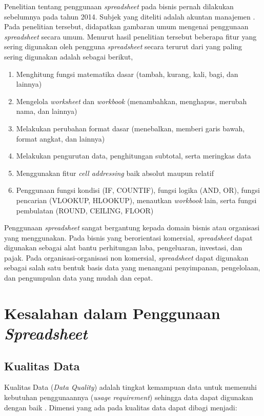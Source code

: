 Penelitian tentang penggunaan \textit{spreadsheet} pada bisnis pernah dilakukan sebelumnya pada tahun 2014. Subjek yang diteliti adalah akuntan manajemen \citep{Bradbard2014}. Pada penelitian tersebut, didapatkan gambaran umum mengenai penggunaan \textit{spreadsheet} secara umum. Menurut hasil penelitian tersebut beberapa fitur yang sering digunakan oleh pengguna \textit{spreadsheet} secara terurut dari yang paling sering digunakan adalah sebagai berikut,

\begin{enumerate}
    \item Menghitung fungsi matematika dasar (tambah, kurang, kali, bagi, dan lainnya)
    \item Mengelola \textit{worksheet} dan \textit{workbook} (menambahkan, menghapus, merubah nama, dan lainnya)
    \item Melakukan perubahan format dasar (menebalkan, memberi garis bawah, format angkat, dan lainnya)
    \item Melakukan pengurutan data, penghitungan subtotal, serta meringkas data
    \item Menggunakan fitur \textit{cell addressing} baik absolut maupun relatif
    \item Penggunaan fungsi kondisi (IF, COUNTIF), fungsi logika (AND, OR), fungsi pencarian (VLOOKUP, HLOOKUP), menautkan \textit{workbook} lain, serta fungsi pembulatan (ROUND, CEILING, FLOOR)
\end{enumerate}

Penggunaan \textit{spreadsheet} sangat bergantung kepada domain bisnis atau organisasi yang menggunakan. Pada bisnis yang berorientasi komersial, \textit{spreadsheet} dapat digunakan sebagai alat bantu perhitungan laba, pengeluaran, investasi, dan pajak. Pada organisasi-organisasi non komersial, \textit{spreadsheet} dapat digunakan sebagai salah satu bentuk basis data yang menangani penyimpanan, pengelolaan, dan pengumpulan data yang mudah dan cepat.

\section{Kesalahan dalam Penggunaan \textit{Spreadsheet}}
\subsection{Kualitas Data}
Kualitas Data (\textit{Data Quality}) adalah tingkat kemampuan data untuk memenuhi kebutuhan penggunaannya (\textit{usage requirement}) sehingga data dapat digunakan dengan baik \citep{Khatri2010}. Dimensi yang ada pada kualitas data dapat dibagi menjadi:

